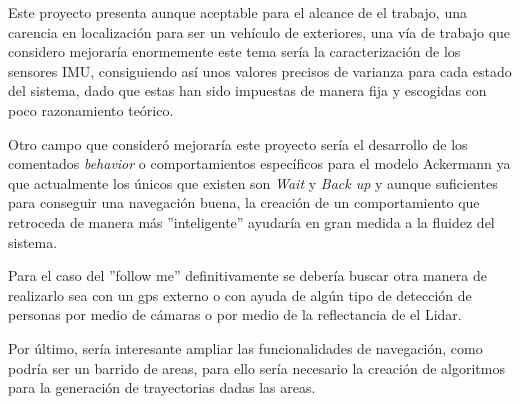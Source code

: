 Este proyecto presenta aunque aceptable para el alcance de el trabajo, una carencia en localización para ser un vehículo de exteriores, 
una vía de trabajo que considero mejoraría enormemente este tema sería la caracterización de los sensores IMU, consiguiendo así unos 
valores precisos de varianza para cada estado del sistema, dado que estas han sido impuestas de manera fija y escogidas con poco 
razonamiento teórico.

Otro campo que consideró mejoraría este proyecto sería el desarrollo de los comentados \textit{behavior} o comportamientos específicos para 
el modelo Ackermann ya que actualmente los únicos que existen son \textit{Wait} y \textit{Back up} y aunque suficientes para conseguir una navegación buena,
la creación de un comportamiento que retroceda de manera más ''inteligente'' ayudaría en gran medida a la fluidez del sistema.

Para el caso del ''follow me'' definitivamente se debería buscar otra manera de realizarlo sea con un gps externo o con ayuda de algún tipo de 
detección de personas por medio de cámaras o por medio de la reflectancia de el Lidar.

Por último, sería interesante ampliar las funcionalidades de navegación, como podría ser un barrido de areas, para ello sería necesario 
la creación de algoritmos para la generación de trayectorias dadas las areas.